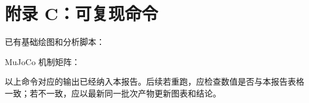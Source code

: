 \section{附录 C：可复现命令}\label{ux9644ux5f55-cux53efux590dux73b0ux547dux4ee4}

已有基础绘图和分析脚本：

\begin{Shaded}
\begin{Highlighting}[]
\end{Highlighting}
\end{Shaded}

MuJoCo 机制矩阵：

\begin{Shaded}
\begin{Highlighting}[]
 
\end{Highlighting}
\end{Shaded}

以上命令对应的输出已经纳入本报告。后续若重跑，应检查数值是否与本报告表格一致；若不一致，应以最新同一批次产物更新图表和结论。

